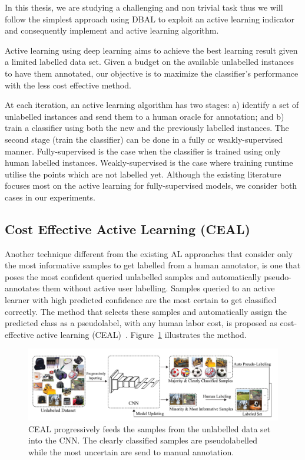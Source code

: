 In this thesis, we are studying a challenging and non trivial task thus we will follow the simplest approach using DBAL to exploit an active learning indicator and consequently implement and active learning algorithm.

Active learning using deep learning aims to achieve the best learning result given a limited labelled data set. Given a budget on the available unlabelled instances to have them annotated, our objective is to maximize the classifier's performance with the less cost effective method.

At each iteration, an active learning algorithm has two stages: a) identify a set of unlabelled instances and send them to a human oracle for annotation; and b) train a classifier using both the new and the previously labelled instances. The second stage (train the classifier) can be done in a fully or weakly-supervised manner. 
Fully-supervised is the case when the classifier is trained using only human labelled instances. Weakly-supervised is the case where training runtime utilise the points which are not labelled yet. Although the existing literature focuses most on the active learning for fully-supervised models, we consider both cases in our experiments.


\subsection{Cost Effective Active Learning (CEAL)}
\label{c5:section_ceal}

Another technique different from the existing AL approaches that consider only the most informative samples to get labelled from a human annotator, is one that poses the most confident queried unlabelled samples and automatically pseudo-annotates them without active user labelling.
Samples queried to an active learner with high predicted confidence are the most certain to get classified correctly. The method that selects these samples and automatically assign the predicted class as a pseudolabel, with any human labor cost, is proposed as cost-effective active learning (CEAL)~\cite{wang2016cost}. Figure~\ref{c5:figure_ceal} illustrates the method.

\begin{figure}[ht!]
    \centering  
    \includegraphics[width=\textwidth]{figures/chap5/al/ceal}
    \caption{CEAL progressively feeds the samples from the unlabelled data set into the CNN. The clearly classified samples are pseudolabelled while the most uncertain are send to manual annotation.}
    \label{c5:figure_ceal}
\end{figure}


